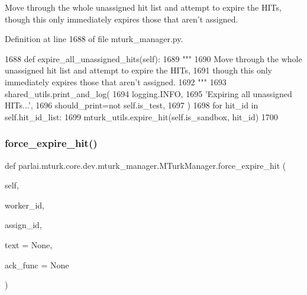 \begin{DoxyVerb}Move through the whole unassigned hit list and attempt to expire the HITs,
though this only immediately expires those that aren't assigned.
\end{DoxyVerb}
 

Definition at line 1688 of file mturk\+\_\+manager.\+py.


\begin{DoxyCode}
1688     \textcolor{keyword}{def }expire\_all\_unassigned\_hits(self):
1689         \textcolor{stringliteral}{"""}
1690 \textcolor{stringliteral}{        Move through the whole unassigned hit list and attempt to expire the HITs,}
1691 \textcolor{stringliteral}{        though this only immediately expires those that aren't assigned.}
1692 \textcolor{stringliteral}{        """}
1693         shared\_utils.print\_and\_log(
1694             logging.INFO,
1695             \textcolor{stringliteral}{'Expiring all unassigned HITs...'},
1696             should\_print=\textcolor{keywordflow}{not} self.is\_test,
1697         )
1698         \textcolor{keywordflow}{for} hit\_id \textcolor{keywordflow}{in} self.hit\_id\_list:
1699             mturk\_utils.expire\_hit(self.is\_sandbox, hit\_id)
1700 
\end{DoxyCode}
\mbox{\label{classparlai_1_1mturk_1_1core_1_1dev_1_1mturk__manager_1_1MTurkManager_a95b15080d7a14ee2207fa0643530ce95}} 
\subsubsection{\texorpdfstring{force\+\_\+expire\+\_\+hit()}{force\_expire\_hit()}}
{\footnotesize\ttfamily def parlai.\+mturk.\+core.\+dev.\+mturk\+\_\+manager.\+M\+Turk\+Manager.\+force\+\_\+expire\+\_\+hit (\begin{DoxyParamCaption}\item[{}]{self,  }\item[{}]{worker\+\_\+id,  }\item[{}]{assign\+\_\+id,  }\item[{}]{text = {\ttfamily None},  }\item[{}]{ack\+\_\+func = {\ttfamily None} }\end{DoxyParamCaption})}

